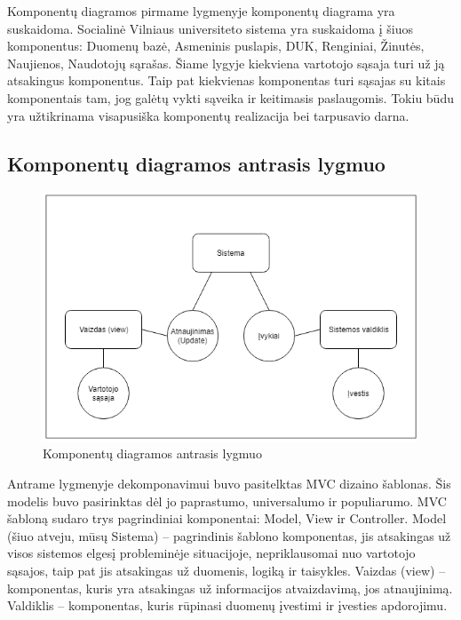 \documentclass{VUMIFPSkursinis}
\begin{document}
Komponentų diagramos pirmame lygmenyje komponentų diagrama yra suskaidoma. Socialinė Vilniaus universiteto sistema yra suskaidoma į šiuos komponentus: Duomenų bazė, Asmeninis puslapis, DUK, Renginiai, Žinutės, Naujienos, Naudotojų sąrašas. Šiame lygyje kiekviena vartotojo sąsaja turi už ją atsakingus komponentus. Taip pat kiekvienas komponentas turi sąsajas su kitais komponentais tam, jog galėtų vykti sąveika ir keitimasis paslaugomis. Tokiu būdu yra užtikrinama visapusiška komponentų realizacija bei tarpusavio darna.

\subsection{Komponentų diagramos antrasis lygmuo}

\begin{figure}[H]
	\centering
	\includegraphics[width=\linewidth]{img/2lygmuo.png}
	\caption{Komponentų diagramos antrasis lygmuo}
	\label{fig:0lygmuo}
\end{figure}

Antrame lygmenyje dekomponavimui buvo pasitelktas MVC dizaino šablonas. Šis modelis buvo pasirinktas dėl jo paprastumo, universalumo ir populiarumo.
MVC šabloną sudaro trys pagrindiniai komponentai: Model, View ir Controller. Model (šiuo atveju, mūsų Sistema) – pagrindinis šablono komponentas, jis atsakingas už visos sistemos elgesį probleminėje situacijoje, nepriklausomai nuo vartotojo sąsajos, taip pat jis atsakingas už duomenis, logiką ir taisykles. Vaizdas (view) – komponentas, kuris
yra atsakingas už informacijos atvaizdavimą, jos atnaujinimą. Valdiklis – komponentas,
kuris rūpinasi duomenų įvestimi ir įvesties apdorojimu.
\end{document}
